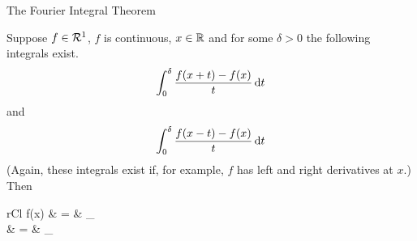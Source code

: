 \begin{section}{The Fourier Integral Theorem}

\begin{thrm}\label{thrm:FIT2}
	Suppose $f \in \mathcal{R}^1$, $f$ is continuous, ${x} \in \mathbb{R}$ and
	for some $\delta > 0$ the following integrals exist.
		\begin{displaymath}
			\int_{0}^{\delta}{\frac{f(x+t)-f(x)}{t}}\, \mathrm{d}{t}
		\end{displaymath}
	and
		\begin{displaymath}
			\int_{0}^{\delta}{\frac{f(x-t)-f(x)}{t}}\, \mathrm{d}{t}
		\end{displaymath}
	(Again, these integrals exist if, for example, $f$ has left and
	right derivatives at $x$.) Then
		\begin{IEEEeqnarray*}{rCl}
			f(x) & = & \lim_{\lambda \rightarrow \infty}
				 \\
			& = & \lim_{\lambda \rightarrow \infty}
		\end{IEEEeqnarray*}
\end{thrm}


\end{section}
